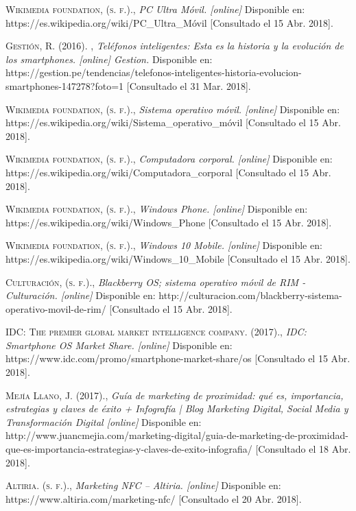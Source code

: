  \textsc{Wikimedia foundation, (s. f.).}, 
\textit{PC Ultra Móvil. [online] }
Disponible en: https://es.wikipedia.org/wiki/PC\_Ultra\_Móvil [Consultado el 15 Abr. 2018].

 \textsc{ Gestión, R. (2016). }, 
\textit{ Teléfonos inteligentes: Esta es la historia y la evolución de los smartphones. [online] Gestion. }
Disponible en: https://gestion.pe/tendencias/telefonos-inteligentes-historia-evolucion-smartphones-147278?foto=1 [Consultado el 31 Mar. 2018].

 \textsc{Wikimedia foundation, (s. f.).}, 
\textit{ Sistema operativo móvil. [online] }
Disponible en: https://es.wikipedia.org/wiki/Sistema\_operativo\_móvil  [Consultado el 15 Abr. 2018].

 \textsc{Wikimedia foundation, (s. f.).}, 
\textit{ Computadora corporal. [online] }
Disponible en: https://es.wikipedia.org/wiki/Computadora\_corporal  [Consultado el 15 Abr. 2018].

 \textsc{Wikimedia foundation, (s. f.).}, 
\textit{ Windows Phone. [online] }
Disponible en: https://es.wikipedia.org/wiki/Windows\_Phone [Consultado el 15 Abr. 2018].

 \textsc{Wikimedia foundation, (s. f.).}, 
\textit{ Windows 10 Mobile. [online] }
Disponible en: https://es.wikipedia.org/wiki/Windows\_10\_Mobile  [Consultado el 15 Abr. 2018].

 \textsc{Culturación, (s. f.).}, 
\textit{Blackberry OS; sistema operativo móvil de RIM - Culturación. [online] }
Disponible en: http://culturacion.com/blackberry-sistema-operativo-movil-de-rim/  [Consultado el 15 Abr. 2018].

 \textsc{IDC: The premier global market intelligence company. (2017).}, 
\textit{IDC: Smartphone OS Market Share. [online] }
Disponible en: https://www.idc.com/promo/smartphone-market-share/os  [Consultado el 15 Abr. 2018].

 \textsc{Mejía Llano, J. (2017).}, 
\textit{Guía de marketing de proximidad: qué es,  importancia, estrategias y claves de éxito + Infografía | Blog Marketing Digital, Social Media y Transformación Digital [online] }
Disponible en: http://www.juancmejia.com/marketing-digital/guia-de-marketing-de-proximidad-que-es-importancia-estrategias-y-claves-de-exito-infografia/  [Consultado el 18 Abr. 2018].

 \textsc{Altiria. (s. f.).}, 
\textit{Marketing NFC – Altiria. [online] }
Disponible en: https://www.altiria.com/marketing-nfc/ [Consultado el 20 Abr. 2018].

